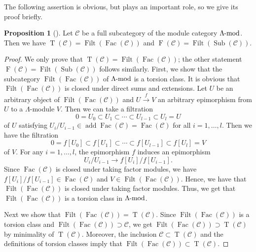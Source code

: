 \documentclass[pdftex,a4paper]{article}
\numberwithin{equation}{subsection}
\theoremstyle{definition}
\newtheorem{proposition}[theorem]{Proposition}
\newcommand{\lmod}{\operatorname{\mathrm{\hspace{-2pt}-mod}}}
\newcommand{\add}{\operatorname{\mathrm{add}}}
\newcommand{\Fac}{\operatorname{\mathrm{Fac}}}
\newcommand{\Sub}{\operatorname{\mathrm{Sub}}}
\newcommand{\Filt}{\operatorname{\mathrm{Filt}}}
\newcommand{\torscl}{\operatorname{\mathrm{T}}}
\newcommand{\torfcl}{\operatorname{\mathrm{F}}}
\begin{document}
The following assertion is obvious, but plays an important role, so we give its proof briefly.
\begin{proposition}[{\cite[Lemma 3.1]{MR3723626}}]\label{filt and closure 2021-12-06 11:12:23}
	Let \(\mathcal{C}\) be a full subcategory of the module category \(\Lambda \lmod\).
	Then we have \(\torscl(\mathcal{C})=\Filt(\Fac(\mathcal{C}))\) and \(\torfcl(\mathcal{C})=\Filt(\Sub(\mathcal{C}))\).
\end{proposition}
\begin{proof}
	We only prove that \(\torscl(\mathcal{C})=\Filt(\Fac(\mathcal{C}))\); the other statement \(\torfcl(\mathcal{C})=\Filt(\Sub(\mathcal{C}))\) follows similarly.
	First, we show that the subcategory \(\Filt(\Fac(\mathcal{C}))\) of \(\Lambda\lmod\) is a torsion class.
	It is obvious that \(\Filt(\Fac(\mathcal{C}))\) is closed under direct sums and extensions.
	Let \(U\) be an arbitrary object of \(\Filt(\Fac(\mathcal{C}))\) and \(U\xrightarrow{f} V\) an arbitrary epimorphism from \(U\) to a \(\Lambda\)-module \(V\).
	Then we can take a filtration
	\begin{equation}
		0=U_0\subset U_1\subset \cdots\subset U_{l-1}\subset U_l=U
	\end{equation}
	of \(U\) satisfying \(U_{i}/U_{i-1} \in \add \Fac(\mathcal{C})=\Fac(\mathcal{C})\) for all \(i=1, \ldots, l\). Then we have the filtration
	\begin{equation}
		0=f[U_0]\subset f[U_1]\subset \cdots\subset f[U_{l-1}]\subset f[U_l]=V
	\end{equation}
	of \(V\).
	For any \(i=1,\ldots, l\), the epimorphism \(f\) induces an epimorphism
	\begin{equation}
		U_i/U_{i-1}\rightarrow f[U_{i}]/f[U_{i-1}].
	\end{equation}
	Since \(\Fac(\mathcal{C})\) is closed under taking factor modules, we have \(f[U_{i}]/f[U_{i-1}] \in \Fac(\mathcal{C})\) and \(V\in \Filt(\Fac(\mathcal{C}))\).
	Hence, we have that \(\Filt(\Fac(\mathcal{C}))\) is closed under taking factor modules. Thus, we get that \(\Filt(\Fac(\mathcal{C}))\) is a torsion class in \(\Lambda\lmod\).

	Next we show that \(\Filt(\Fac(\mathcal{C}))=\torscl(\mathcal{C})\).
	Since \(\Filt(\Fac(\mathcal{C}))\) is a torsion class and \(\Filt(\Fac(\mathcal{C}))\supset \mathcal{C}\), we get \(\Filt(\Fac(\mathcal{C})) \supset \torscl(\mathcal{C})\) by minimality of \(\torscl(\mathcal{C})\).
	Moreover, the inclusion \(\mathcal{C}\subset \torscl(\mathcal{C})\) and the definitions of torsion classes imply that
	\(\Filt(\Fac(\mathcal{C}))\subset\torscl(\mathcal{C})\).
\end{proof}
\end{document}
